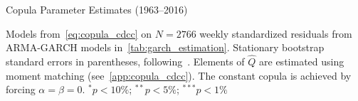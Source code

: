 
\begin{table}
  \centering
  \footnotesize
  \renewcommand{\arraystretch}{1.2}

  \caption{Copula Parameter Estimates (1963--2016)}

  \begin{longcaption}
    Models from~\autoref{eq:copula_cdcc} on $N = 2766$ weekly standardized residuals from ARMA-GARCH models in~\autoref{tab:garch_estimation}. Stationary bootstrap standard errors in parentheses, following~\autocite{PolitisRomano1994}. Elements of $\hat{Q}$ are estimated using moment matching (see~\autoref{app:copula_cdcc}). The constant copula is achieved by forcing $\alpha = \beta = 0$. $^{*}p<10\%$; $^{**}p<5\%$; $^{***}p<1\%$
  \end{longcaption}


\end{table}
